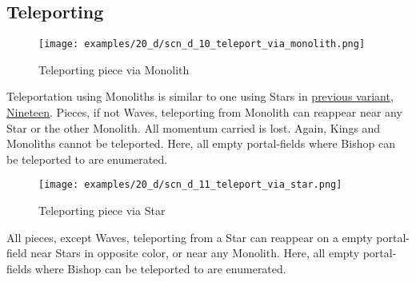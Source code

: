 \clearpage %

\subsection*{Teleporting}
\label{sec:Discovery/Monolith/Teleporting}

\vspace*{-1.4\baselineskip}
\noindent
\begin{figure}[!h]
\texttt{[image: examples/20\_d/scn\_d\_10\_teleport\_via\_monolith.png]}
\vspace*{-1.3\baselineskip}
\caption{Teleporting piece via Monolith}
\label{fig:scn_d_10_teleport_via_monolith}
\end{figure}

\vspace*{-0.4\baselineskip}
Teleportation using Monoliths is similar to one using Stars in \hyperref[fig:scn_n_02_teleport_init]{previous variant, Nineteen}.
Pieces, if not Waves, teleporting from Monolith can reappear near any Star or the other Monolith.
All momentum carried is lost. Again, Kings and Monoliths cannot be teleported.
Here, all empty portal-fields where Bishop can be teleported to are enumerated.

\clearpage %

\noindent
\begin{figure}[!h]
\texttt{[image: examples/20\_d/scn\_d\_11\_teleport\_via\_star.png]}
\vspace*{-1.3\baselineskip}
\caption{Teleporting piece via Star}
\label{fig:scn_d_11_teleport_via_star}
\end{figure}

\vspace*{-0.4\baselineskip}
All pieces, except Waves, teleporting from a Star can reappear on a empty portal-field
near Stars in opposite color, or near any Monolith.
Here, all empty portal-fields where Bishop can be teleported to are enumerated.

\clearpage %


